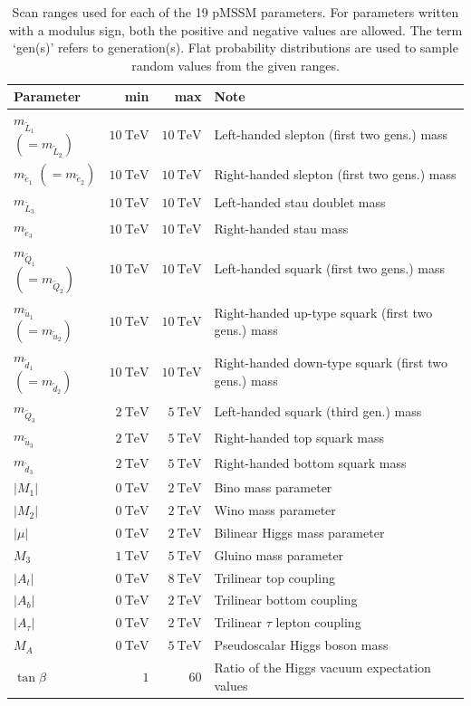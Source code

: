 \begin{table}
	\centering
	\small
	\caption{Scan ranges used for each of the 19 pMSSM parameters. For parameters written with a modulus sign, both the positive and negative values are allowed. The term `gen(s)' refers to generation(s). Flat probability distributions are used to sample random values from the given ranges.}
	\setlength\heavyrulewidth{0.2ex}
	\begin{tabular} {l r r l}
		\toprule
		Parameter & min & max & Note \\ 
		\midrule
		$m_{\tilde{L}_1}$ $(=m_{\tilde{L}_2})$ & $\SI{10}{\TeV}$ & $\SI{10}{\TeV}$ & Left-handed slepton (first two gens.) mass \\
		$m_{\tilde{e}_1}$ $(=m_{\tilde{e}_2})$ & $\SI{10}{\TeV}$ & $\SI{10}{\TeV}$ & Right-handed slepton (first two gens.) mass \\ 
		$m_{\tilde{L}_3}$ & $\SI{10}{\TeV}$ & $\SI{10}{\TeV}$ & Left-handed stau doublet mass \\
		$m_{\tilde{e}_3}$ & $\SI{10}{\TeV}$ & $\SI{10}{\TeV}$ & Right-handed stau mass \\
		\midrule
		$m_{\tilde{Q}_1}$ $(=m_{\tilde{Q}_2})$ & $\SI{10}{\TeV}$ & $\SI{10}{\TeV}$ & Left-handed squark (first two gens.) mass \\
		$m_{\tilde{u}_1}$ $(=m_{\tilde{u}_2})$ & $\SI{10}{\TeV}$ & $\SI{10}{\TeV}$ & Right-handed up-type squark (first two gens.) mass \\
		$m_{\tilde{d}_1}$ $(=m_{\tilde{d}_2})$ &$\SI{10}{\TeV}$ & $\SI{10}{\TeV}$ & Right-handed down-type squark (first two gens.) mass \\
		$m_{\tilde{Q}_3}$ & $\SI{2}{\TeV}$ & $\SI{5}{\TeV}$ & Left-handed squark (third gen.) mass \\
		$m_{\tilde{u}_3}$ & $\SI{2}{\TeV}$ & $\SI{5}{\TeV}$ & Right-handed top squark mass \\
		$m_{\tilde{d}_3}$ & $\SI{2}{\TeV}$ & $\SI{5}{\TeV}$ & Right-handed bottom squark mass \\
		\midrule
		$\vert M_1\vert$ & $\SI{0}{\TeV}$ & $\SI{2}{\TeV}$ & Bino mass parameter \\
		$\vert M_2\vert$ & $\SI{0}{\TeV}$ & $\SI{2}{\TeV}$ & Wino mass parameter \\
		$\vert\mu\vert$ & $\SI{0}{\TeV}$ & $\SI{2}{\TeV}$ & Bilinear Higgs mass parameter \\
		$M_3$ & $\SI{1}{\TeV}$ & $\SI{5}{\TeV}$ & Gluino mass parameter \\
		\midrule
		$\vert A_t\vert$ & $\SI{0}{\TeV}$ & $\SI{8}{\TeV}$ & Trilinear top coupling \\
		$\vert A_b\vert$ & $\SI{0}{\TeV}$ & $\SI{2}{\TeV}$ & Trilinear bottom coupling \\
		$\vert A_\tau\vert$ & $\SI{0}{\TeV}$ & $\SI{2}{\TeV}$ & Trilinear $\tau$ lepton coupling \\
		$M_A$ & $\SI{0}{\TeV}$ & $\SI{5}{\TeV}$ & Pseudoscalar Higgs boson mass \\
		$\tan\beta$ & $1$ & $60$ & Ratio of the Higgs vacuum expectation values \\
		\bottomrule
	\end{tabular}


\end{table}
